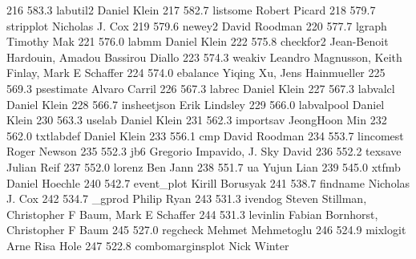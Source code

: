    216    583.3    labutil2      Daniel Klein                            
   217    582.7    listsome      Robert Picard                           
   218    579.7    stripplot     Nicholas J. Cox                         
   219    579.6    newey2        David Roodman                           
   220    577.7    lgraph        Timothy Mak                             
   221    576.0    labmm         Daniel Klein                            
   222    575.8    checkfor2     Jean-Benoit Hardouin, Amadou Bassirou   
                                   Diallo                                  
   223    574.3    weakiv        Leandro Magnusson, Keith Finlay, Mark E 
                                   Schaffer                                
   224    574.0    ebalance      Yiqing Xu, Jens Hainmueller             
   225    569.3    psestimate    Alvaro Carril                           
   226    567.3    labrec        Daniel Klein                            
   227    567.3    labvalcl      Daniel Klein                            
   228    566.7    insheetjson   Erik Lindsley                           
   229    566.0    labvalpool    Daniel Klein                            
   230    563.3    uselab        Daniel Klein                            
   231    562.3    importsav     JeongHoon Min                           
   232    562.0    txtlabdef     Daniel Klein                            
   233    556.1    cmp           David Roodman                           
   234    553.7    lincomest     Roger Newson                            
   235    552.3    jb6           Gregorio Impavido, J. Sky David         
   236    552.2    texsave       Julian Reif                             
   237    552.0    lorenz        Ben Jann                                
   238    551.7    ua            Yujun Lian                              
   239    545.0    xtfmb         Daniel Hoechle                          
   240    542.7    event_plot    Kirill Borusyak                         
   241    538.7    findname      Nicholas J. Cox                         
   242    534.7    _gprod        Philip Ryan                             
   243    531.3    ivendog       Steven Stillman, Christopher F Baum,    
                                   Mark E Schaffer                         
   244    531.3    levinlin      Fabian Bornhorst, Christopher F Baum    
   245    527.0    regcheck      Mehmet Mehmetoglu                       
   246    524.9    mixlogit      Arne Risa Hole                          
   247    522.8    combomarginsplot  Nick Winter                             
